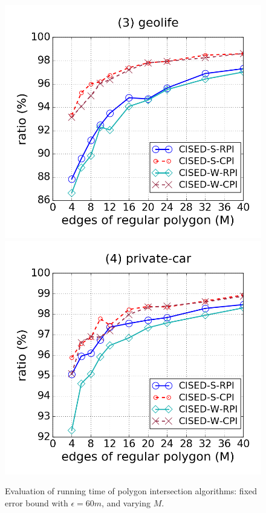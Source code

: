 \begin{figure}[tb!]
\includegraphics[scale = 0.250]{figures/Exp-M-poly-time-ratio-geolife.png}
\includegraphics[scale = 0.250]{figures/Exp-M-poly-time-ratio-private.png}
\vspace{-2ex}
\caption{\small Evaluation of running time of polygon intersection algorithms: fixed error bound with $\epsilon=60m$, and varying $M$.}
\label{fig:m-poly-time}
\vspace{-2ex}
\end{figure}


